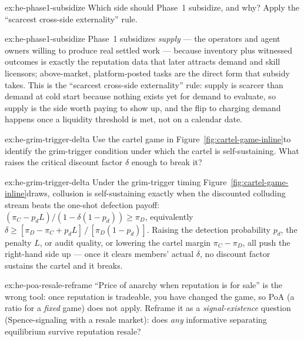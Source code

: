 \documentclass[11pt,a4paper]{article}
\theoremstyle{definition}
\theoremstyle{definition}
\theoremstyle{remark}
\begin{document}

\begin{pdexercise}[kind=Check,rating=1]{ex:he-phase1-subsidize}
Which side should Phase~1 subsidize, and why? Apply the ``scarcest cross-side
  externality'' rule.
\end{pdexercise}
\begin{pdsolution}{ex:he-phase1-subsidize}
Phase~1 subsidizes \emph{supply} --- the operators and agent owners willing
to produce real settled work --- because inventory plus witnessed outcomes is
exactly the reputation data that later attracts demand and skill licensors;
above-market, platform-posted tasks are the direct form that subsidy takes. This
is the ``scarcest cross-side externality'' rule: supply is scarcer than demand
at cold start because nothing exists yet for demand to evaluate, so supply is
the side worth paying to show up, and the flip to charging demand happens once a
liquidity threshold is met, not on a calendar date.
\end{pdsolution}
\begin{pdexercise}[kind=Trace,rating=2]{ex:he-grim-trigger-delta}
Use \ifpdbook the cartel game in \else Figure~\ref{fig:cartel-game-inline}\fi to identify the grim-trigger
  condition under which the cartel is self-sustaining. What raises the critical
  discount factor $\delta$ enough to break it?
\end{pdexercise}
\begin{pdsolution}{ex:he-grim-trigger-delta}
Under the grim-trigger timing \ifpdbook {}\else Figure~\ref{fig:cartel-game-inline}\fi draws,
collusion is self-sustaining exactly when the discounted colluding stream beats
the one-shot defection payoff: $(\pi_C - p_d L)/(1-\delta(1-p_d)) \ge \pi_D$,
equivalently $\delta \ge [\pi_D - \pi_C + p_d L]\,/\,[\pi_D(1-p_d)]$. Raising the
detection probability $p_d$, the penalty $L$, or audit quality, or lowering the
cartel margin $\pi_C-\pi_D$, all push the right-hand side up --- once it clears
members' actual $\delta$, no discount factor sustains the cartel and it breaks.
\end{pdsolution}
\begin{pdexercise}[kind=Open,rating=3]{ex:he-poa-resale-reframe}
``Price of anarchy when reputation is for sale'' is the wrong tool:
  once reputation is tradeable, you have changed the game, so PoA (a ratio for a
  \emph{fixed} game) does not apply. Reframe it as a \emph{signal-existence}
  question (Spence-signaling with a resale market): does \emph{any} informative
  separating equilibrium survive reputation resale?
\end{pdexercise}
\end{document}
